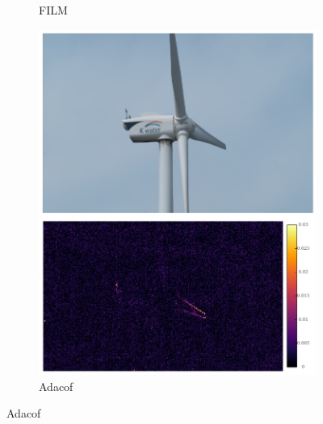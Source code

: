 \documentclass{article}
\begin{document}
\begin{figure}
\begin{subfigure}{0.25\textwidth}
    \caption{FILM}
\end{subfigure}%
\begin{subfigure}{0.25\textwidth}
	\centering
    \includegraphics[width=1\linewidth]{qua_imgs/TEST02_045_f0465_adacof.jpg}
    \caption{Adacof}
\end{subfigure}






\end{figure}
\end{document}
